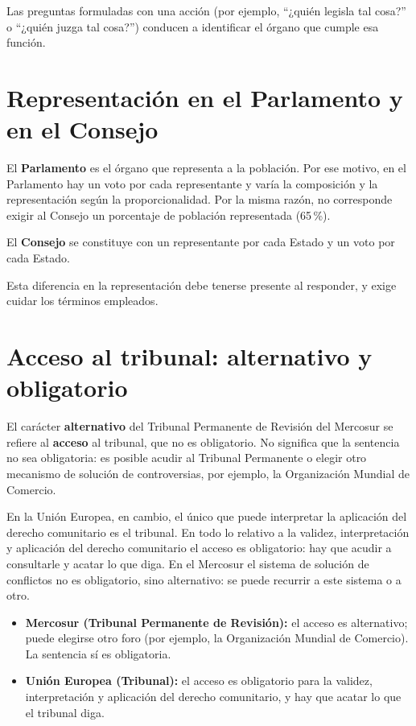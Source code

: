 \documentclass[12pt,oneside]{book}
\begin{document}
Las preguntas formuladas con una acción (por ejemplo, ``¿quién legisla tal cosa?'' o ``¿quién juzga tal cosa?'') conducen a identificar el órgano que cumple esa función.

\section{Representación en el Parlamento y en el Consejo}

El \textbf{Parlamento} es el órgano que representa a la población. Por ese motivo, en el Parlamento hay un voto por cada representante y varía la composición y la representación según la proporcionalidad. Por la misma razón, no corresponde exigir al Consejo un porcentaje de población representada (65\,\%).

El \textbf{Consejo} se constituye con un representante por cada Estado y un voto por cada Estado.

Esta diferencia en la representación debe tenerse presente al responder, y exige cuidar los términos empleados.

\section{Acceso al tribunal: alternativo y obligatorio}

El carácter \textbf{alternativo} del Tribunal Permanente de Revisión del Mercosur se refiere al \textbf{acceso} al tribunal, que no es obligatorio. No significa que la sentencia no sea obligatoria: es posible acudir al Tribunal Permanente o elegir otro mecanismo de solución de controversias, por ejemplo, la Organización Mundial de Comercio.

En la Unión Europea, en cambio, el único que puede interpretar la aplicación del derecho comunitario es el tribunal. En todo lo relativo a la validez, interpretación y aplicación del derecho comunitario el acceso es obligatorio: hay que acudir a consultarle y acatar lo que diga. En el Mercosur el sistema de solución de conflictos no es obligatorio, sino alternativo: se puede recurrir a este sistema o a otro.

\begin{important}
\begin{itemize}
    \item \textbf{Mercosur (Tribunal Permanente de Revisión):} el acceso es alternativo; puede elegirse otro foro (por ejemplo, la Organización Mundial de Comercio). La sentencia sí es obligatoria.
    \item \textbf{Unión Europea (Tribunal):} el acceso es obligatorio para la validez, interpretación y aplicación del derecho comunitario, y hay que acatar lo que el tribunal diga.
\end{itemize}
\end{important}
\end{document}
